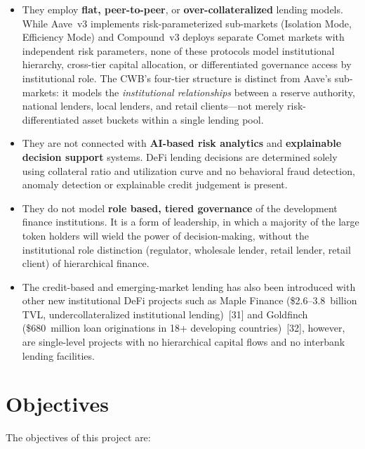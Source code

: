 \documentclass[12pt,a4paper]{report}
\begin{document}
\begin{itemize}[noitemsep]
\item They employ \textbf{flat, peer-to-peer}, or \textbf{over-collateralized} lending models. While Aave~v3 implements risk-parameterized sub-markets (Isolation Mode, Efficiency Mode) and Compound~v3 deploys separate Comet markets with independent risk parameters, none of these protocols model institutional hierarchy, cross-tier capital allocation, or differentiated governance access by institutional role. The CWB's four-tier structure is distinct from Aave's sub-markets: it models the \textit{institutional relationships} between a reserve authority, national lenders, local lenders, and retail clients---not merely risk-differentiated asset buckets within a single lending pool.
\item They are not connected with \textbf{AI-based risk analytics} and \textbf{explainable decision support} systems. DeFi lending decisions are determined solely using collateral ratio and utilization curve and no behavioral fraud detection, anomaly detection or explainable credit judgement is present.
\item They do not model \textbf{role based, tiered governance} of the development finance institutions. It is a form of leadership, in which a majority of the large token holders will wield the power of decision-making, without the institutional role distinction (regulator, wholesale lender, retail lender, retail client) of hierarchical finance.
\item The credit-based and emerging-market lending has also been introduced with other new institutional DeFi projects such as Maple Finance (\$2.6--3.8~billion TVL, undercollateralized institutional lending)~[31] and Goldfinch (\$680~million loan originations in 18+ developing countries)~[32], however, are single-level projects with no hierarchical capital flows and no interbank lending facilities.
\end{itemize}

\section{Objectives}

The objectives of this project are:
\end{document}
